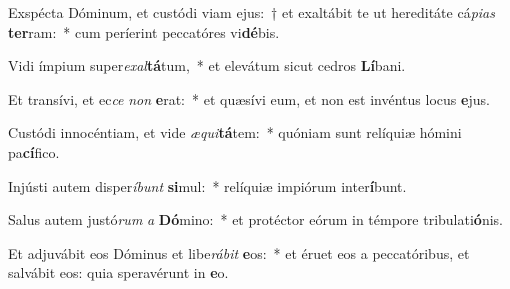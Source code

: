 \item Exspécta Dóminum, et custódi viam ejus:~† et exaltábit te ut hereditáte cá\textit{pi}\textit{as} \textbf{ter}ram:~* cum períerint peccatóres vi\textbf{dé}bis.
\item Vidi ímpium super\textit{ex}\textit{al}\textbf{tá}tum,~* et elevátum sicut cedros \textbf{Lí}bani.
\item Et transívi, et ec\textit{ce} \textit{non} \textbf{e}rat:~* et quæsívi eum, et non est invéntus locus \textbf{e}jus.
\item Custódi innocéntiam, et vide \textit{æ}\textit{qui}\textbf{tá}tem:~* quóniam sunt relíquiæ hómini pa\textbf{cí}fico.
\item Injústi autem disper\textit{í}\textit{bunt} \textbf{si}mul:~* relíquiæ impiórum inter\textbf{í}bunt.
\item Salus autem justó\textit{rum} \textit{a} \textbf{Dó}mino:~* et protéctor eórum in témpore tribulati\textbf{ó}nis.
\item Et adjuvábit eos Dóminus et libe\textit{rá}\textit{bit} \textbf{e}os:~* et éruet eos a peccatóribus, et salvábit eos: quia speravérunt in \textbf{e}o.
